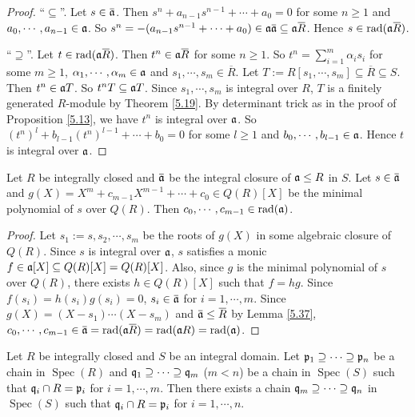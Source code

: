 \begin{proof}
    ``$\subseteq$''. Let $s \in \overbar{\ffa}$. Then $s^{n} + a_{n-1}s^{n-1} + \cdots + a_0 = 0$ for some $n \geq 1$ and $a_0,\cdots,a_{n-1} \in \mathfrak{a}$. So $s^{n} = -(a_{n-1}s^{n-1} + \cdots + a_0) \in \ffa \overbar{\ffa} \subseteq \ffa \overbar{R}$. Hence $s \in \operatorname{rad}(\ffa \overbar{R})$. \par 
    ``$\supseteq$''. Let $t \in \operatorname{rad}(\ffa \overbar{R})$. Then $t^{n} \in \ffa \overbar{R}$ for some $n \geq 1$. So $t^{n} = \sum_{i=1}^{m} \alpha_is_i$ for some $m \geq 1$, $\alpha_1,\cdots,\alpha_m \in \mathfrak{a}$ and $s_1,\cdots,s_m \in \overbar{R}$. Let $T := R[s_1,\cdots,s_m] \subseteq \overbar{R} \subseteq S$. Then $t^{n} \in \mathfrak{a} T$. So $t^{n}T \subseteq \mathfrak{a} T$. Since $s_1,\cdots,s_m$ is integral over $R$, $T$ is a finitely generated $R$-module by Theorem \ref{5.19}. By determinant trick as in the proof of Proposition \ref{5.13}, we have $t^{n}$ is integral over $\mathfrak{a}$. So $(t^{n})^{l} + b_{l-1}(t^{n})^{l-1} + \cdots + b_0 = 0$ for some $l \geq 1$ and $b_0,\cdots,b_{l-1} \in \mathfrak{a}$. Hence $t$ is integral over $\mathfrak{a}$.
\end{proof}

\begin{proposition}\label{5.38}
    Let $R$ be integrally closed and $\overbar{\ffa}$ be the integral closure of $\mathfrak{a} \leq R$ in $S$. Let $s \in \overbar{\ffa}$ and $g(X) = X^{m} + c_{m-1}X^{m-1} + \cdots + c_0 \in Q(R)[X]$ be the minimal polynomial of $s$ over $Q(R)$. Then $c_0,\cdots,c_{m-1} \in \operatorname{rad}(\mathfrak{a})$.
\end{proposition}

\begin{proof}
    Let $s_1:=s,s_2,\cdots,s_m$ be the roots of $g(X)$ in some algebraic closure of $Q(R)$. Since $s$ is integral over $\mathfrak{a}$, $s$ satisfies a monic $f \in \mathfrak{a}[X] \subseteq Q(R)[X] = Q(R)[X]$. Also, since $g$ is the minimal polynomial of $s$ over $Q(R)$, there exists $h \in Q(R)[X]$ such that $f = hg$. Since $f(s_i) = h(s_i)g(s_i) = 0$, $s_i \in \overbar{\ffa}$ for $i = 1,\cdots,m$. Since $g(X) = (X-s_1) \cdots (X-s_m)$ and $\overbar{\ffa} \leq \overbar{R}$ by Lemma \ref{5.37}, $c_0,\cdots,c_{m-1} \in \overbar{\ffa} = \operatorname{rad}(\ffa \overbar{R}) = \operatorname{rad}(\ffa R) = \operatorname{rad}(\ffa)$. 
\end{proof}

\begin{theorem}\label{5.39}
    Let $R$ be integrally closed and $S$ be an integral domain. Let $\mathfrak{p}_1 \supseteq \cdots \supseteq \mathfrak{p}_n$ be a chain in $\operatorname{Spec}(R)$ and $\mathfrak{q}_1 \supseteq \cdots \supseteq \mathfrak{q}_m$ ($m < n$) be a chain in $\operatorname{Spec}(S)$ such that $\mathfrak{q}_i \cap R = \mathfrak{p}_i$ for $i = 1,\cdots,m$. Then there exists a chain $\mathfrak{q}_m \supseteq \cdots \supseteq \mathfrak{q}_n$ in $\operatorname{Spec}(S)$ such that $\mathfrak{q}_i \cap R = \mathfrak{p}_i$ for $i = 1,\cdots,n$. 
\end{theorem}

